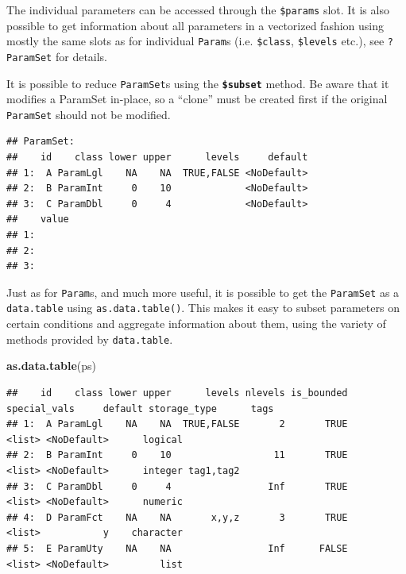 \documentclass[]{article}
\newenvironment{Shaded}{\begin{snugshade}}{\end{snugshade}}
\newcommand{\KeywordTok}[1]{\textcolor[rgb]{0.13,0.29,0.53}{\textbf{#1}}}
\newcommand{\NormalTok}[1]{#1}
\newcommand{\OperatorTok}[1]{\textcolor[rgb]{0.81,0.36,0.00}{\textbf{#1}}}
\newcommand{\StringTok}[1]{\textcolor[rgb]{0.31,0.60,0.02}{#1}}
\renewenvironment{Shaded} {\begin{snugshade}\small} {\end{snugshade}}
\begin{document}
The individual parameters can be accessed through the \texttt{\$params} slot.
It is also possible to get information about all parameters in a vectorized fashion using mostly the same slots as for individual \texttt{Param}s (i.e. \texttt{\$class}, \texttt{\$levels} etc.), see \texttt{?ParamSet} for details.

It is possible to reduce \texttt{ParamSet}s using the \textbf{\texttt{\$subset}} method.
Be aware that it modifies a ParamSet in-place, so a ``clone'' must be created first if the original \texttt{ParamSet} should not be modified.

\begin{Shaded}
\end{Shaded}

\begin{verbatim}
## ParamSet: 
##    id    class lower upper      levels     default
## 1:  A ParamLgl    NA    NA  TRUE,FALSE <NoDefault>
## 2:  B ParamInt     0    10             <NoDefault>
## 3:  C ParamDbl     0     4             <NoDefault>
##    value
## 1:      
## 2:      
## 3:
\end{verbatim}

Just as for \texttt{Param}s, and much more useful, it is possible to get the \texttt{ParamSet} as a \texttt{data.table} using \texttt{as.data.table()}.
This makes it easy to subset parameters on certain conditions and aggregate information about them, using the variety of methods provided by \texttt{data.table}.

\begin{Shaded}
\begin{Highlighting}[]
\KeywordTok{as.data.table}\NormalTok{(ps)}
\end{Highlighting}
\end{Shaded}

\begin{verbatim}
##    id    class lower upper      levels nlevels is_bounded special_vals     default storage_type      tags
## 1:  A ParamLgl    NA    NA  TRUE,FALSE       2       TRUE       <list> <NoDefault>      logical          
## 2:  B ParamInt     0    10                  11       TRUE       <list> <NoDefault>      integer tag1,tag2
## 3:  C ParamDbl     0     4                 Inf       TRUE       <list> <NoDefault>      numeric          
## 4:  D ParamFct    NA    NA       x,y,z       3       TRUE       <list>           y    character          
## 5:  E ParamUty    NA    NA                 Inf      FALSE       <list> <NoDefault>         list
\end{verbatim}
\end{document}
